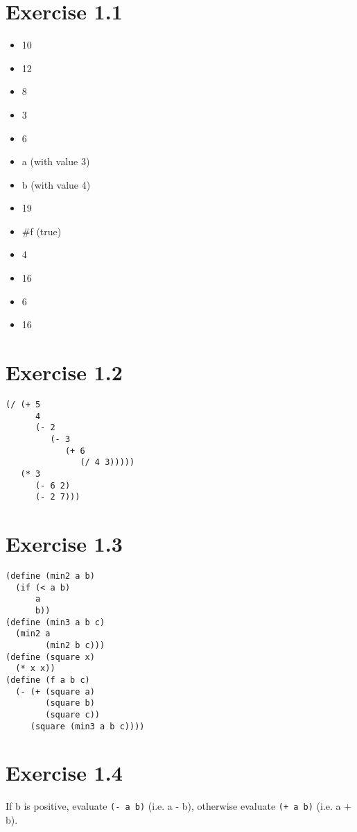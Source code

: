 \documentclass[../main.tex]{subfiles}
\begin{document}
\section{Exercise 1.1}

\begin{multicols}{2}
  \begin{itemize}
    \item 10
    \item 12
    \item 8
    \item 3
    \item 6
    \item a (with value 3)
    \item b (with value 4)
    \item 19
    \item \#f (true)
    \item 4
    \item 16
    \item 6
    \item 16
  \end{itemize}
\end{multicols}

\section{Exercise 1.2}

\begin{lstlisting}
(/ (+ 5
      4
      (- 2
         (- 3
            (+ 6
               (/ 4 3)))))
   (* 3
      (- 6 2)
      (- 2 7)))
\end{lstlisting}

\section{Exercise 1.3}

\begin{lstlisting}
(define (min2 a b)
  (if (< a b)
      a
      b))
(define (min3 a b c)
  (min2 a
        (min2 b c)))
(define (square x)
  (* x x))
(define (f a b c)
  (- (+ (square a)
        (square b)
        (square c))
     (square (min3 a b c))))
\end{lstlisting}

\section{Exercise 1.4}

If b is positive, evaluate \lstinline{(- a b)} (i.e. a - b), otherwise evaluate \lstinline{(+ a b)} (i.e. a + b).
\end{document}
